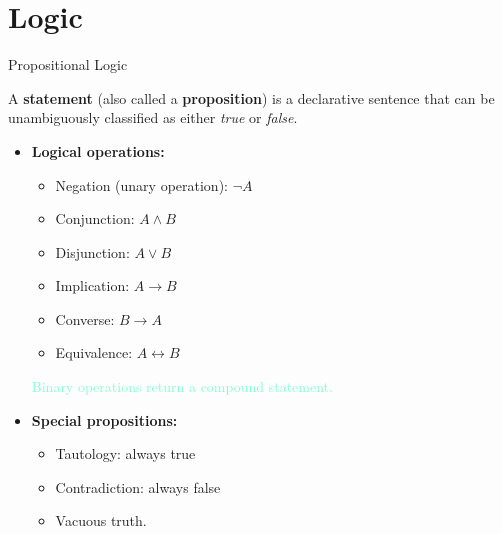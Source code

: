 \documentclass[dvipsnames]{beamer}
\theoremstyle{plain}
\theoremstyle{definition}
\begin{document}
\section{Logic}
\begin{frame}{Propositional Logic}

\begin{definition}
A \textbf{statement} (also called a \textbf{proposition}) is a declarative sentence 
that can be unambiguously classified as either \emph{true} or \emph{false}.
\end{definition}

\begin{itemize}
  \item \textbf{Logical operations:}
    \begin{itemize}
      \item Negation (unary operation): $\lnot A$
      \item Conjunction: $A \land B$
      \item Disjunction: $A \lor B$
      \item Implication: $A \to B$
      \item Converse: $B \to A$
      \item Equivalence: $A \leftrightarrow B$
    \end{itemize}
    \textcolor{Aquamarine}{Binary operations return a compound statement.}
  \item \textbf{Special propositions:}
    \begin{itemize}
      \item Tautology: always true
      \item Contradiction: always false
      \item Vacuous truth.
    \end{itemize}
\end{itemize}

\end{frame}
\end{document}
